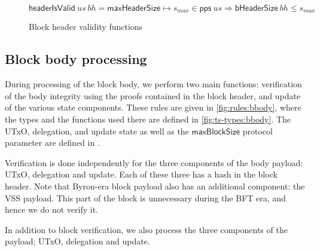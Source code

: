 \documentclass[11pt,a4paper]{article}
\newcommand{\var}[1]{\mathit{#1}}
\newcommand{\fun}[1]{\mathsf{#1}}
\newcommand{\pp}[1]{\mathsf{#1}}
\newcommand{\maxblocksize}{\pp{maxBlockSize}}
\newcommand{\maxheadersize}{\pp{maxHeaderSize}}
\newcommand{\bhdrsizename}{bHeaderSize}
\newcommand{\bhdrsize}[1]{\fun{\bhdrsizename} ~ #1}
\begin{document}
\begin{figure}[ht]
  \begin{equation}
    \label{eq:func:header-is-valid}
    \fun{headerIsValid}~\var{us}~\var{bh} = \maxheadersize \mapsto \var{s_{max}} \in \fun{pps}~\var{us} \Rightarrow \bhdrsize{bh} \leq \var{s_{max}}
  \end{equation}
  \caption{Block header validity functions}
\end{figure}

\clearpage

\subsection{Block body processing}

During processing of the block body, we perform two main functions:
verification of the body integrity using the proofs contained in the block
header, and update of the various state components. These rules are given in
\cref{fig:rules:bbody}, where the types and the functions used there are
defined in \cref{fig:ts-types:bbody}. The UTxO, delegation, and update state as
well as the $\maxblocksize{}$ protocol parameter are defined in
\cite{byron_ledger_spec}.

Verification is done independently for the three components of the body payload:
UTxO, delegation and update. Each of these three has a hash in the block
header. Note that Byron-era block payload also has an additional component: the
VSS payload. This part of the block is unnecessary during the BFT era, and hence
we do not verify it.

In addition to block verification, we also process the three components of the
payload; UTxO, delegation and update.
\end{document}
